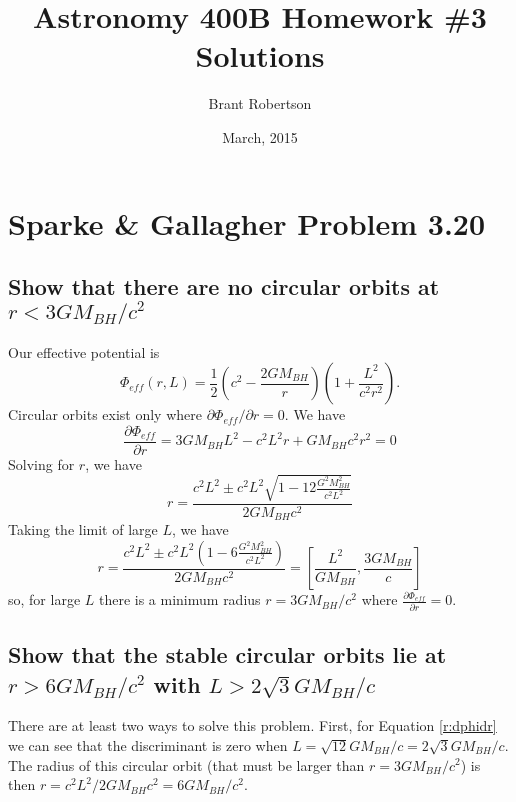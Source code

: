 \documentclass[]{article}
\title{Astronomy 400B Homework \#3 Solutions}
\author{Brant Robertson}
\date{March, 2015}
\begin{document}
\maketitle

\section{Sparke \& Gallagher Problem 3.20}

\subsection{Show that there are no circular orbits at $r<3GM_{BH}/c^2$}

Our effective potential is
\begin{equation}
\Phi_{eff}(r,L) = \frac{1}{2}\left(c^2-\frac{2GM_{BH}}{r}\right)\left(1+ \frac{L^2}{c^2r^2}\right).
\end{equation}
\noindent
Circular orbits exist only where $\partial \Phi_{eff}/\partial r = 0$.  We have
\begin{equation}
\frac{\partial \Phi_{eff}}{\partial r} = 3GM_{BH}L^2 - c^2L^2r + GM_{BH}c^2r^2 =0
\end{equation}
Solving for $r$, we have
\begin{equation}
\label{r:dphidr}
r = \frac{c^2L^2 \pm c^2 L^2 \sqrt{1-12\frac{G^2M_{BH}^2}{c^2L^2}} }{2GM_{BH}c^2}
\end{equation}
\noindent
Taking the limit of large $L$, we have
\begin{equation}
r = \frac{c^2L^2 \pm c^2 L^2 \left( 1-6 \frac{G^2M_{BH}^2}{c^2L^2}\right) }{2GM_{BH}c^2} = \left[\frac{L^2}{GM_{BH}}, \frac{3GM_{BH}}{c}\right]
\end{equation}
\noindent
so, for large $L$ there is a minimum radius $r = 3GM_{BH}/c^2$ where $\frac{\partial \Phi_{eff}}{\partial r}=0$.

\subsection{Show that the stable circular orbits lie at $r>6GM_{BH}/c^2$ with $L>2\sqrt{3}GM_{BH}/c$}

There are at least two ways to solve this problem.  First, for Equation \ref{r:dphidr} 
we can see that the discriminant is zero when $L = \sqrt{12}GM_{BH}/c = 2 \sqrt{3} G M_{BH}/c$.
The radius of this circular orbit (that must be larger than $r = 3 GM_{BH}/c^2$) is then $r = c^2 L^2 / 2 GM_{BH} c^2 = 6 G M_{BH} / c^2$.
\end{document}
